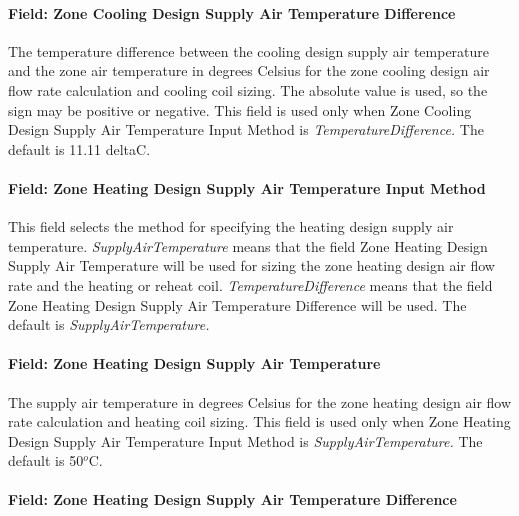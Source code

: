 \paragraph{Field: Zone Cooling Design Supply Air Temperature Difference}\label{field-zone-cooling-design-supply-air-temperature-difference-7}

The temperature difference between the cooling design supply air temperature and the zone air temperature in degrees Celsius for the zone cooling design air flow rate calculation and cooling coil sizing. The absolute value is used, so the sign may be positive or negative. This field is used only when Zone Cooling Design Supply Air Temperature Input Method is \emph{TemperatureDifference.} The default is 11.11 deltaC.

\paragraph{Field: Zone Heating Design Supply Air Temperature Input Method}\label{field-zone-heating-design-supply-air-temperature-input-method-7}

This field selects the method for specifying the heating design supply air temperature. \emph{SupplyAirTemperature} means that the field Zone Heating Design Supply Air Temperature will be used for sizing the zone heating design air flow rate and the heating or reheat coil. \emph{TemperatureDifference} means that the field Zone Heating Design Supply Air Temperature Difference will be used. The default is \emph{SupplyAirTemperature.}

\paragraph{Field: Zone Heating Design Supply Air Temperature}\label{field-zone-heating-design-supply-air-temperature-6}

The supply air temperature in degrees Celsius for the zone heating design air flow rate calculation and heating coil sizing. This field is used only when Zone Heating Design Supply Air Temperature Input Method is \emph{SupplyAirTemperature.} The default is 50\(^{o}\)C.

\paragraph{Field: Zone Heating Design Supply Air Temperature Difference}\label{field-zone-heating-design-supply-air-temperature-difference-7}

